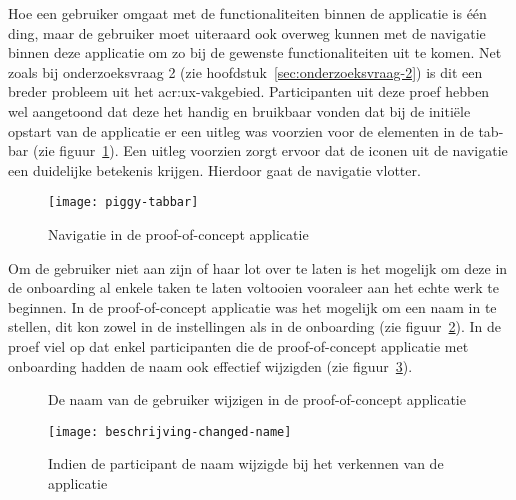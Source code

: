 Hoe een gebruiker omgaat met de functionaliteiten binnen de applicatie is één ding, maar de gebruiker moet uiteraard ook overweg kunnen met de navigatie binnen deze applicatie om zo bij de gewenste functionaliteiten uit te komen. Net zoals bij onderzoeksvraag 2 (zie hoofdstuk~\ref{sec:onderzoeksvraag-2}) is dit een breder probleem uit het \acrshort{acr:ux}-vakgebied. Participanten uit deze proef hebben wel aangetoond dat deze het handig en bruikbaar vonden dat bij de initiële opstart van de applicatie er een uitleg was voorzien voor de elementen in de tab-bar (zie figuur~\ref{fig:piggy:tabbar}). Een uitleg voorzien zorgt ervoor dat de iconen uit de navigatie een duidelijke betekenis krijgen. Hierdoor gaat de navigatie vlotter.

\begin{figure}[h!]
    \centering
    \texttt{[image: piggy-tabbar]}
    \caption{Navigatie in de proof-of-concept applicatie}
    \label{fig:piggy:tabbar}
\end{figure}

Om de gebruiker niet aan zijn of haar lot over te laten is het mogelijk om deze in de onboarding al enkele taken te laten voltooien vooraleer aan het echte werk te beginnen. In de proof-of-concept applicatie was het mogelijk om een naam in te stellen, dit kon zowel in de instellingen als in de onboarding (zie figuur~\ref{fig:piggy:name}). In de proef viel op dat enkel participanten die de proof-of-concept applicatie met onboarding hadden de naam ook effectief wijzigden (zie figuur~\ref{fig:beschrijving-changed-name}).

\begin{figure}[h!]
	\centering
	\qquad
	\qquad
	\caption{De naam van de gebruiker wijzigen in de proof-of-concept applicatie}
	\label{fig:piggy:name}
\end{figure}

\begin{figure}[h]
	\centering
	\texttt{[image: beschrijving-changed-name]}
	\caption{Indien de participant de naam wijzigde bij het verkennen van de applicatie}
	\label{fig:beschrijving-changed-name}
\end{figure}
